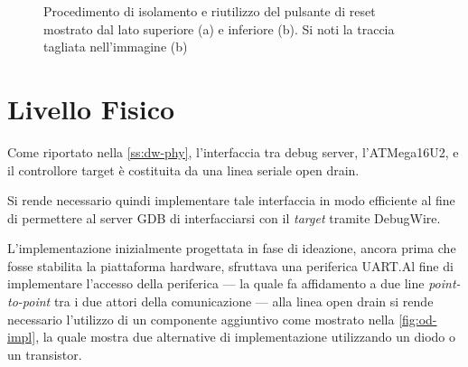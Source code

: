 \begin{figure}[h]
    \centering
    \hspace{8mm}

    \caption[]{Procedimento di isolamento e riutilizzo del pulsante di reset mostrato dal lato superiore (a) e inferiore (b). Si noti la traccia tagliata nell'immagine (b)}\label{fig:rst-rewire}
\end{figure}

\section{Livello Fisico}

Come riportato nella \cref{ss:dw-phy}, l'interfaccia tra debug server, l'ATMega16U2, e il controllore target è costituita da una linea seriale open drain.

Si rende necessario quindi implementare tale interfaccia in modo efficiente al fine di permettere al server GDB di interfacciarsi con il \textit{target} tramite DebugWire.

L'implementazione inizialmente progettata in fase di ideazione, ancora prima che fosse stabilita la piattaforma hardware, sfruttava una periferica UART.\@ Al fine di implementare l'accesso della periferica --- la quale fa affidamento a due line \textit{point-to-point} tra i due attori della comunicazione --- alla linea open drain si rende necessario l'utilizzo di un componente aggiuntivo come mostrato nella \cref{fig:od-impl}, la quale mostra due alternative di implementazione utilizzando un diodo o un transistor. 

